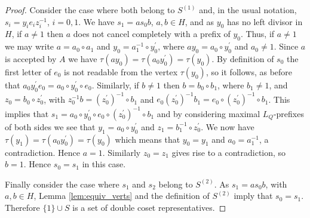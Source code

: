 \documentclass[a4paper,12pt]{article}
\renewcommand{\t}{\tau }
\numberwithin{equation}{section}
\numberwithin{figure}{section}
\begin{document}
\begin{proof}
Consider the case where both belong to $S^{(1)}$ and, in the usual notation,
$s_i=y_i e_i z_i^{-1}$, $i=0,1$. We have $s_1=as_0b$, $a,b\in H$, and as $y_0$ has
no left divisor in $H$, if $a\neq 1$ then $a$ does not cancel completely with
 a prefix of $y_0$. Thus, if $a\neq 1$ we may write $a=a_0\circ a_1$ and
$y_0=a_1^{-1}\circ y_0^\prime$, where $ay_0=a_0\circ y_0^\prime$
and $a_0\neq 1$. Since
$a$ is accepted by $A$ we have $\t(ay_0)=\t(a_0y_0^\prime)=\t(y_0)$. By definition
of $s_0$ the first letter of $e_0$ is not readable from the vertex $\t(y_0)$, so
it follows, as before that $a_0y_0^\prime e_0=a_0\circ y_0^\prime \circ e_0$. 
Similarly,
if $b\neq 1$ then $b=b_0\circ b_1$, where $b_1\neq 1$,  and $z_0=b_0\circ z_0^\prime$, with
$z_0^{-1}b= (z_0^\prime)^{-1}\circ b_1$ and $e_0 (z_0^\prime)^{-1}b_1=
e_0\circ  (z_0^\prime)^{-1}\circ b_1$. This implies that
$s_1=a_0\circ y_0^\prime \circ  e_0\circ  (z_0^\prime)^{-1}\circ b_1$ and by considering
maximal $L_Q$-prefixes of both sides we see that $y_1=a_0\circ y_0^\prime$ and
$z_1=b_1^{-1}\circ z_0^\prime$. We now have  $\t(y_1)=\t(a_0y_0^\prime)=\t(y_0)$ which
 means that
$y_0=y_1$ and $a_0=a_1^{-1}$,  a contradiction. Hence $a=1$.
Similarly $z_0=z_1$ gives rise to  a contradiction, so $b=1$.
Hence $s_0=s_1$ in this case.

Finally consider the case where $s_1$ and $s_2$ belong to
$S^{(2)}$. As $s_1=as_0b$, with $a,b\in H$, Lemma
\ref{lem:equiv_verts} and the definition of $S^{(2)}$ imply  that
$s_0= s_1$. Therefore $\{1\}\cup S$ is a set of double coset
representatives.
\end{proof}
\end{document}

